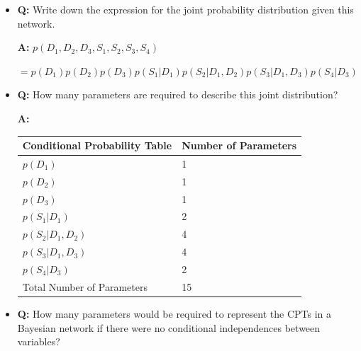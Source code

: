 \documentclass[11pt,letterpaper]{article}
\begin{document}
\begin{itemize}

\item \textbf{Q:} Write down the expression for the joint probability distribution 
given this network.

\begin{solution}
\textbf{A:} $p(D_1, D_2, D_3, S_1, S_2, S_3, S_4) $

 $= p(D_1)p(D_2)p(D_3)p(S_1|D_1)p(S_2|D_1,D_2)p(S_3|D_1,D_3)p(S_4|D_3)$\\
\end{solution}


\item \textbf{Q:} How many parameters are required to describe this joint distribution? 

\begin{solution}
\textbf{A:} 
%
\begin{center}
\begin{tabular}{|l|l|}
\hline
{Conditional Probability Table}&{Number of Parameters} \\
\hline
\hline
$p(D_1)$&1\\
$p(D_2)$&1\\
$p(D_3)$&1\\
$p(S_1|D_1)$&2\\
$p(S_2|D_1,D_2)$&4\\
$p(S_3|D_1,D_3)$&4\\
$p(S_4|D_3)$&2\\
\hline
\hline
Total Number of Parameters&15\\
\hline
\end{tabular}
\end{center} 
\end{solution}


\item \textbf{Q:} How many parameters would be required to represent the CPTs in a Bayesian network
if there were no conditional independences between variables? 


\end{itemize}
\end{document}
